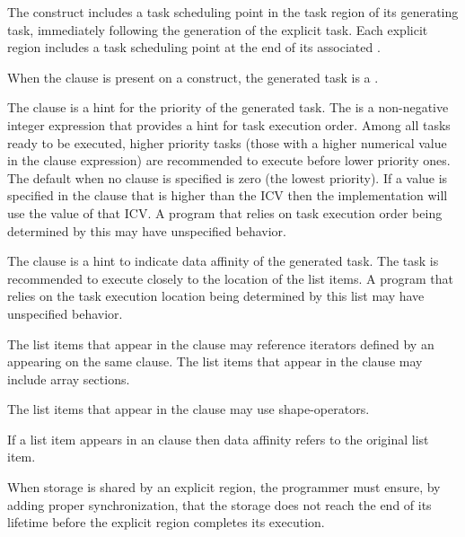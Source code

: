 The  construct includes a task scheduling point in the task region of its generating
task, immediately following the generation of the explicit task. Each explicit 
region includes a task scheduling point at the end of its associated .

When the  clause is present on a  construct, the generated task is a .

The  clause is a hint for the priority of the generated task. The  is a
non-negative integer expression that provides a hint for task execution order. Among all
tasks ready to be executed, higher priority tasks (those with a higher numerical value in the
 clause expression) are recommended to execute before lower priority ones. The default
 when no  clause is specified is zero (the lowest priority). If a value is
specified in the  clause that is higher than the  ICV then the
implementation will use the value of that ICV. A program that relies on task execution order
being determined by this  may have unspecified behavior.

The  clause is a hint to indicate data affinity of the generated
task. The task is recommended to execute closely to the location of the list items. 
A program that relies on the task execution location
being determined by this list may have unspecified behavior.

The list items that appear in the  clause may reference iterators
defined by an  appearing on the same clause.
The list items that appear in the  clause may include array sections.
\begin{ccppspecific}
The list items that appear in the  clause may use shape-operators.
\end{ccppspecific}

If a list item appears in an  clause then data affinity refers to the original list item.

\begin{note}
When storage is shared by an explicit  region, the
programmer must ensure, by adding proper synchronization, that the storage does not
reach the end of its lifetime before the explicit  region completes its execution.
\end{note}

